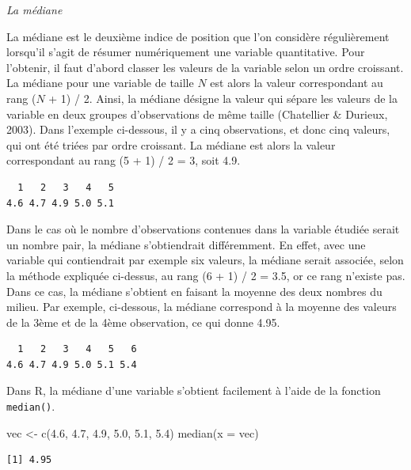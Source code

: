 \documentclass[
  letterpaper,
]{book}
\newenvironment{Shaded}{\begin{snugshade}}{\end{snugshade}}
\newcommand{\AttributeTok}[1]{\textcolor[rgb]{0.40,0.45,0.13}{#1}}
\newcommand{\FloatTok}[1]{\textcolor[rgb]{0.68,0.00,0.00}{#1}}
\newcommand{\FunctionTok}[1]{\textcolor[rgb]{0.28,0.35,0.67}{#1}}
\newcommand{\NormalTok}[1]{\textcolor[rgb]{0.00,0.23,0.31}{#1}}
\newcommand{\OtherTok}[1]{\textcolor[rgb]{0.00,0.23,0.31}{#1}}
\begin{document}
\emph{La médiane}

La médiane est le deuxième indice de position que l'on considère
régulièrement lorsqu'il s'agit de résumer numériquement une variable
quantitative. Pour l'obtenir, il faut d'abord classer les valeurs de la
variable selon un ordre croissant. La médiane pour une variable de
taille \(N\) est alors la valeur correspondant au rang (\(N\) + 1) / 2.
Ainsi, la médiane désigne la valeur qui sépare les valeurs de la
variable en deux groupes d'observations de même taille (Chatellier \&
Durieux, 2003). Dans l'exemple ci-dessous, il y a cinq observations, et
donc cinq valeurs, qui ont été triées par ordre croissant. La médiane
est alors la valeur correspondant au rang (5 + 1) / 2 = 3, soit 4.9.

\begin{verbatim}
  1   2   3   4   5 
4.6 4.7 4.9 5.0 5.1 
\end{verbatim}

Dans le cas où le nombre d'observations contenues dans la variable
étudiée serait un nombre pair, la médiane s'obtiendrait différemment. En
effet, avec une variable qui contiendrait par exemple six valeurs, la
médiane serait associée, selon la méthode expliquée ci-dessus, au rang
(6 + 1) / 2 = 3.5, or ce rang n'existe pas. Dans ce cas, la médiane
s'obtient en faisant la moyenne des deux nombres du milieu. Par exemple,
ci-dessous, la médiane correspond à la moyenne des valeurs de la 3ème et
de la 4ème observation, ce qui donne 4.95.

\begin{verbatim}
  1   2   3   4   5   6 
4.6 4.7 4.9 5.0 5.1 5.4 
\end{verbatim}

Dans R, la médiane d'une variable s'obtient facilement à l'aide de la
fonction \texttt{median()}.

\begin{Shaded}
\begin{Highlighting}[]
\NormalTok{vec }\OtherTok{\textless{}{-}} \FunctionTok{c}\NormalTok{(}\FloatTok{4.6}\NormalTok{, }\FloatTok{4.7}\NormalTok{, }\FloatTok{4.9}\NormalTok{, }\FloatTok{5.0}\NormalTok{, }\FloatTok{5.1}\NormalTok{, }\FloatTok{5.4}\NormalTok{)}
\FunctionTok{median}\NormalTok{(}\AttributeTok{x =}\NormalTok{ vec)}
\end{Highlighting}
\end{Shaded}

\begin{verbatim}
[1] 4.95
\end{verbatim}
\end{document}
